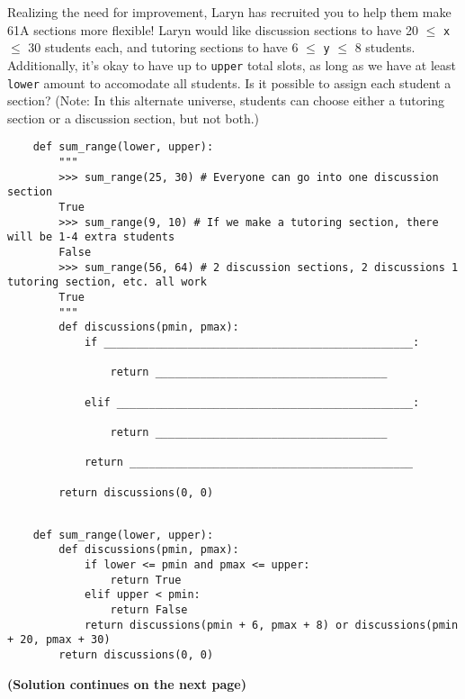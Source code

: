 \begin{blocksection}
    \question Realizing the need for improvement, Laryn has recruited you to help them make 61A sections more flexible! 
    Laryn would like discussion sections to have 20 $\leq$ \lstinline$x$ $\leq$ 30 students each, 
    and tutoring sections to have 6 $\leq$ \lstinline$y$ $\leq$ 8 students. 
    Additionally, it's okay to have up to \lstinline$upper$ total slots, as long as we have at least \lstinline$lower$ amount to accomodate all students.
    Is it possible to assign each student a section? (Note: In this alternate universe, students can choose either
    a tutoring section or a discussion section, but not both.)
    
    \begin{lstlisting}
    def sum_range(lower, upper):
        """
        >>> sum_range(25, 30) # Everyone can go into one discussion section
        True
        >>> sum_range(9, 10) # If we make a tutoring section, there will be 1-4 extra students
        False
        >>> sum_range(56, 64) # 2 discussion sections, 2 discussions 1 tutoring section, etc. all work
        True
        """
        def discussions(pmin, pmax):
            if ________________________________________________:
    
                return ____________________________________
    
            elif ______________________________________________:
    
                return ____________________________________
    
            return ____________________________________________
    
        return discussions(0, 0)
    
    \end{lstlisting}
    \end{blocksection}
    
    \begin{solution}[1.5in]
    \begin{blocksection}
    \begin{lstlisting}
    def sum_range(lower, upper):
        def discussions(pmin, pmax):
            if lower <= pmin and pmax <= upper:
                return True
            elif upper < pmin:
                return False
            return discussions(pmin + 6, pmax + 8) or discussions(pmin + 20, pmax + 30)
        return discussions(0, 0)
    \end{lstlisting}
    
    \textbf{(Solution continues on the next page)}
    \end{blocksection}
    \end{solution}
    
